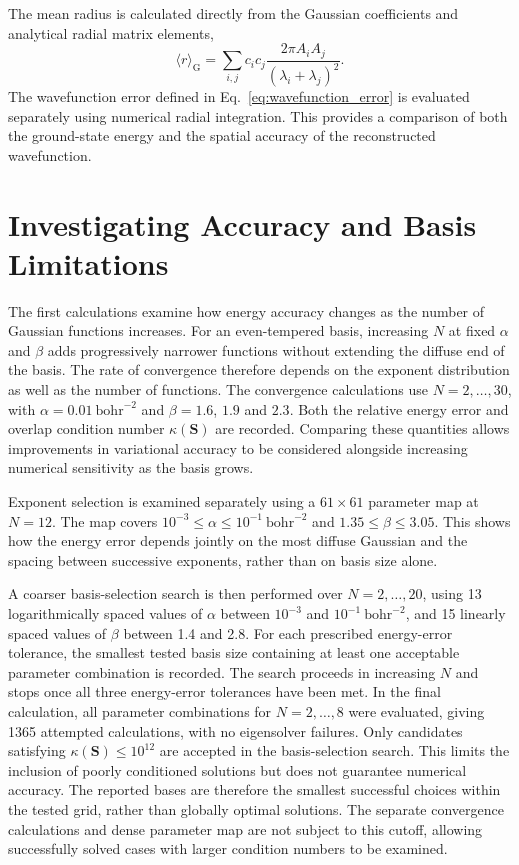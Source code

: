 The mean radius is calculated directly from the Gaussian coefficients and analytical radial matrix elements,
\begin{equation}
    \langle r\rangle_{\mathrm G}
    =\sum_{i,j}c_ic_j
    \frac{2\pi A_iA_j}
         {(\lambda_i+\lambda_j)^2}.
\end{equation}
The wavefunction error defined in Eq.~\eqref{eq:wavefunction_error} is evaluated separately using numerical radial integration. This provides a comparison of both the ground-state energy and the spatial accuracy of the reconstructed wavefunction.



\section{Investigating Accuracy and Basis Limitations}

The first calculations examine how energy accuracy changes as the number of Gaussian functions increases. For an even-tempered basis, increasing $N$ at fixed $\alpha$ and $\beta$ adds progressively narrower functions without extending the diffuse end of the basis. The rate of convergence therefore depends on the exponent distribution as well as the number of functions. The convergence calculations use $N=2,\ldots,30$, with $\alpha=0.01\ \mathrm{bohr}^{-2}$ and $\beta=1.6$, $1.9$ and $2.3$. Both the relative energy error and overlap condition number $\kappa(\mathbf S)$ are recorded. Comparing these quantities allows improvements in variational accuracy to be considered alongside increasing numerical sensitivity as the basis grows.

Exponent selection is examined separately using a $61\times61$ parameter map at $N=12$. The map covers $10^{-3}\leq\alpha\leq10^{-1}\ \mathrm{bohr}^{-2}$ and $1.35\leq\beta\leq3.05$. This shows how the energy error depends jointly on the most diffuse Gaussian and the spacing between successive exponents, rather than on basis size alone.

A coarser basis-selection search is then performed over $N=2,\ldots,20$, using 13 logarithmically spaced values of $\alpha$ between $10^{-3}$ and $10^{-1}\ \mathrm{bohr}^{-2}$, and 15 linearly spaced values of $\beta$ between 1.4 and 2.8. For each prescribed energy-error tolerance, the smallest tested basis size containing at least one acceptable parameter combination is recorded.
The search proceeds in increasing $N$ and stops once all three energy-error tolerances have been met. In the final calculation, all parameter combinations for $N=2,\ldots,8$ were evaluated, giving 1365 attempted calculations, with no eigensolver failures.
Only candidates satisfying $\kappa(\mathbf S)\leq10^{12}$ are accepted in the basis-selection search. This limits the inclusion of poorly conditioned solutions but does not guarantee numerical accuracy. The reported bases are therefore the smallest successful choices within the tested grid, rather than globally optimal solutions. The separate convergence calculations and dense parameter map are not subject to this cutoff, allowing successfully solved cases with larger condition numbers to be examined.

